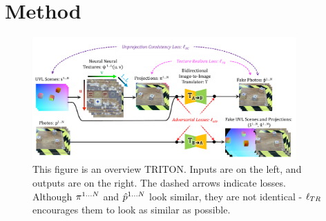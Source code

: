 \documentclass{article}
\begin{document}
\section{Method} \label{sec:method}
	\begin{figure}[thbp]
	    \vspace{-15pt}
		\begin{center}
			\includegraphics[width=0.9\textwidth]{../images/main_diagram_beautiful.pdf}
		\end{center}
		\vspace{-10pt}
		\caption{
			This figure is an overview TRITON.
			Inputs are on the left, and outputs are on the right.
			The dashed arrows indicate losses.
			Although $\pi^{1\dots N}$ and $\hat{p}^{1\dots N}$ look similar, they are not identical - $\ell_{TR}$ encourages them to look as similar as possible.
		}
		\label{fig:main_diagram}
	\end{figure}
\end{document}
